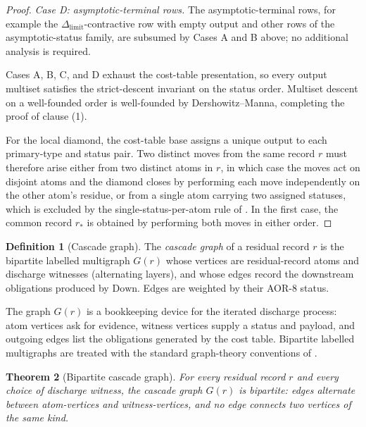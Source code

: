 \documentclass[11pt]{article}
\newcommand{\Dlimit}{\Delta_{\mathrm{limit}}}
\newtheorem{theorem}{Theorem}[section]
\theoremstyle{definition}
\newtheorem{definition}[theorem]{Definition}
\begin{document}
\begin{proof}
\emph{Case D: asymptotic-terminal rows.}  The asymptotic-terminal rows, for
example the \(\Dlimit\)-contractive row with empty output and other rows of
the asymptotic-status family, are subsumed by Cases A and B above; no
additional analysis is required.

Cases A, B, C, and D exhaust the cost-table presentation, so every output
multiset satisfies the strict-descent invariant on the status order.
Multiset descent on a well-founded order is well-founded by
Dershowitz--Manna, completing the proof of clause (1).

For the local diamond, the cost-table base assigns a unique output to each
primary-type and status pair.  Two distinct moves from the same record \(r\)
must therefore arise either from two distinct atoms in \(r\), in which case
the moves act on disjoint atoms and the diamond closes by performing each
move independently on the other atom's residue, or from a single atom
carrying two assigned statuses, which is excluded by the
single-status-per-atom rule of .  In the first
case, the common record \(r_*\) is obtained by performing both moves in
either order.
\end{proof}

\begin{definition}[Cascade graph]\label{def:aor:cascade-graph}
The \emph{cascade graph} of a residual record $r$ is the bipartite
labelled multigraph $G(r)$ whose vertices are residual-record atoms
and discharge witnesses (alternating layers), and whose edges record
the downstream obligations produced by $\mathrm{Down}$.  Edges are
weighted by their AOR-8 status.
\end{definition}

The graph \(G(r)\) is a bookkeeping device for the iterated discharge
process: atom vertices ask for evidence, witness vertices supply a
status and payload, and outgoing edges list the obligations generated
by the cost table.  Bipartite labelled multigraphs are treated with
the standard graph-theory conventions of \citet{Diestel2017GraphTheory}.

\begin{theorem}[Bipartite cascade graph]\label{thm:aor:cascade-bipartite}
For every residual record $r$ and every choice of discharge witness,
the cascade graph $G(r)$ is bipartite: edges alternate between
atom-vertices and witness-vertices, and no edge connects two vertices
of the same kind.
\end{theorem}
\end{document}
